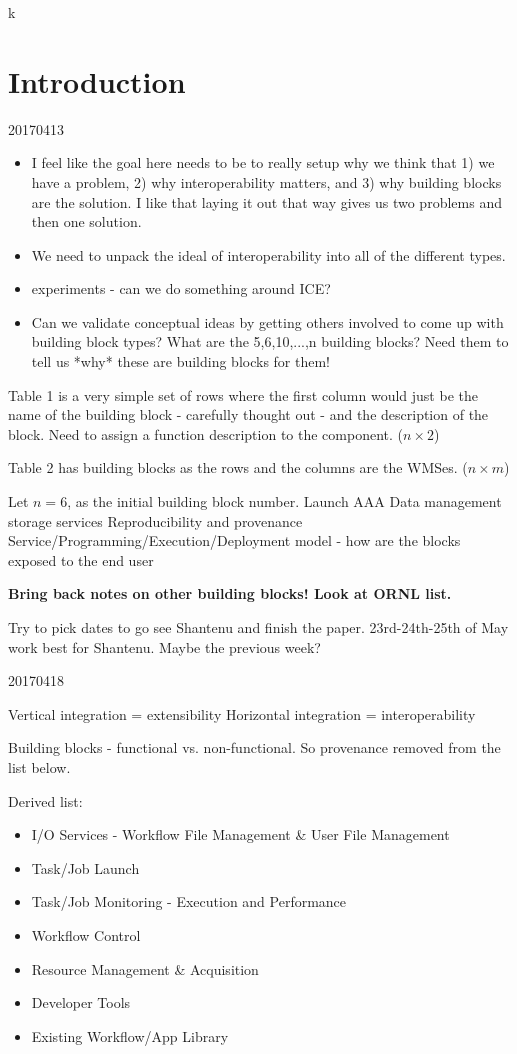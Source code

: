 k\section{Introduction}

20170413
\begin{itemize}
\item I feel like the goal here needs to be to really setup why we think that 1) we have a problem, 2) why interoperability matters, and 3) why building blocks are the solution. I like that laying it out that way gives us two problems and then one solution.
\item We need to unpack the ideal of interoperability into all of the different types.
\item experiments - can we do something around ICE?
\item Can we validate conceptual ideas by getting others involved to come up with building block types? What are the 5,6,10,...,n building blocks? Need them to tell us *why* these are building blocks for them!
\end{itemize}

Table 1 is a very simple set of rows where the first column would just be the name of the building block - carefully thought out - and the description of the block. Need to assign a function description to the component. ($n \times 2$)

Table 2 has building blocks as the rows and the columns are the WMSes. ($n \times m$)

Let $n = 6$, as the initial building block number.
Launch
AAA
Data management storage services
Reproducibility and provenance
Service/Programming/Execution/Deployment model - how are the blocks exposed to the end user

\textbf{Bring back notes on other building blocks! Look at ORNL list.}

Try to pick dates to go see Shantenu and finish the paper. 23rd-24th-25th of May work best for Shantenu. Maybe the previous week?

20170418

Vertical integration = extensibility
Horizontal integration = interoperability

Building blocks - functional vs. non-functional. So provenance removed from the list below.

Derived list:
\begin{itemize}
\item I/O Services - Workflow File Management \& User File Management
\item Task/Job Launch
\item Task/Job Monitoring - Execution and Performance
\item Workflow Control
\item Resource Management \& Acquisition
\item Developer Tools
\item Existing Workflow/App Library
\end{itemize}

